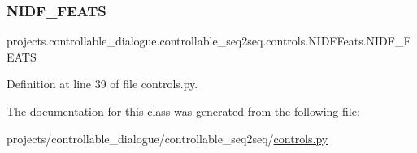 \subsubsection{\texorpdfstring{N\+I\+D\+F\+\_\+\+F\+E\+A\+TS}{NIDF\_FEATS}}
{\footnotesize\ttfamily projects.\+controllable\+\_\+dialogue.\+controllable\+\_\+seq2seq.\+controls.\+N\+I\+D\+F\+Feats.\+N\+I\+D\+F\+\_\+\+F\+E\+A\+TS}



Definition at line 39 of file controls.\+py.



The documentation for this class was generated from the following file\+:\begin{DoxyCompactItemize}
\item 
projects/controllable\+\_\+dialogue/controllable\+\_\+seq2seq/\hyperlink{controls_8py}{controls.\+py}\end{DoxyCompactItemize}
